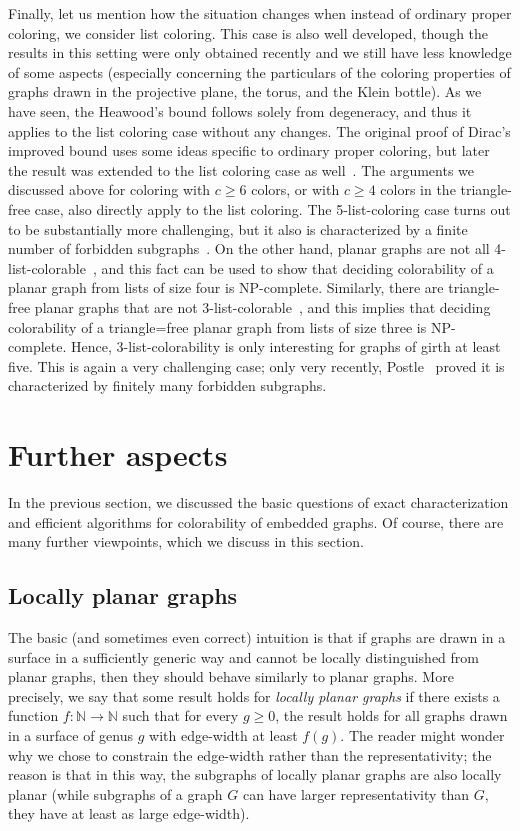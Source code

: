 \documentclass[12pt,twoside,openright,a4paper]{book}
\begin{document}
Finally, let us mention how the situation changes when instead of ordinary proper coloring, we consider list coloring.
This case is also well developed, though the results in this setting were only obtained recently and we still have
less knowledge of some aspects (especially concerning the particulars of the coloring properties of graphs drawn in the projective plane,
the torus, and the Klein bottle).  As we have seen, the Heawood's bound follows solely from degeneracy, and thus it applies to the list
coloring case without any changes.  The original proof of Dirac's improved bound uses some ideas specific to ordinary proper coloring,
but later the result was extended to the list coloring case as well~\cite{bohmelc,listdir2}.  The arguments we discussed above for coloring with $c\ge 6$
colors, or with $c\ge 4$ colors in the triangle-free case, also directly apply to the list coloring.  The 5-list-coloring case turns out to be
substantially more challenging, but it also is characterized by a finite number of forbidden subgraphs~\cite{lukethe}.
On the other hand, planar graphs are not all 4-list-colorable~\cite{voigt1993}, and this fact can be used to show that deciding colorability of
a planar graph from lists of size four is NP-complete.  Similarly, there are triangle-free planar graphs that are not 3-list-colorable~\cite{voigt1995},
and this implies that deciding colorability of a triangle=free planar graph from lists of size three is NP-complete.
Hence, 3-list-colorability is only interesting for graphs of girth at least five.  This is again a very challenging case; only very recently,
Postle~\cite{postle3crit} proved it is characterized by finitely many forbidden subgraphs.

\section{Further aspects}

In the previous section, we discussed the basic questions of exact characterization and efficient algorithms for colorability
of embedded graphs.  Of course, there are many further viewpoints, which we discuss in this section.

\subsection{Locally planar graphs}
The basic (and sometimes even correct) intuition is that if graphs are drawn in a surface in a sufficiently generic way and cannot be locally distinguished
from planar graphs, then they should behave similarly to planar graphs.  More precisely, we say that some result holds for \emph{locally planar graphs}
if there exists a function $f:\mathbb{N}\to\mathbb{N}$ such that for every $g\ge 0$, the result holds for all graphs drawn in a surface of genus $g$
with edge-width at least $f(g)$.  The reader might wonder why we chose to constrain the edge-width rather than the representativity; the reason
is that in this way, the subgraphs of locally planar graphs are also locally planar (while subgraphs of a graph $G$ can have larger representativity than $G$,
they have at least as large edge-width).
\end{document}
